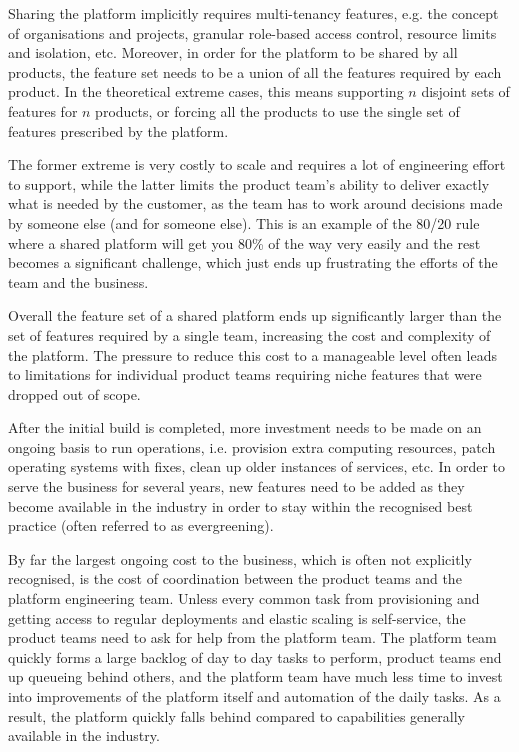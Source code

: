 \documentclass[reprint,amsmath,amssymb,aps]{revtex4-1}
\begin{document}
Sharing the platform implicitly requires multi-tenancy features, e.g. the concept of organisations and projects, granular role-based access control, resource limits and isolation, etc. Moreover, in order for the platform to be shared by all products, the feature set needs to be a union of all the features required by each product. In the theoretical extreme cases, this means supporting $n$ disjoint sets of features for $n$ products, or forcing all the products to use the single set of features prescribed by the platform.

The former extreme is very costly to scale and requires a lot of engineering effort to support, while the latter limits the product team’s ability to deliver exactly what is needed by the customer, as the team has to work around decisions made by someone else (and for someone else). This is an example of the 80/20 rule where a shared platform will get you 80\% of the way very easily and the rest becomes a significant challenge, which just ends up frustrating the efforts of the team and the business.

Overall the feature set of a shared platform ends up significantly larger than the set of features required by a single team, increasing the cost and complexity of the platform. The pressure to reduce this cost to a manageable level often leads to limitations for individual product teams requiring niche features that were dropped out of scope.

After the initial build is completed, more investment needs to be made on an ongoing basis to run operations, i.e. provision extra computing resources, patch operating systems with fixes, clean up older instances of services, etc. In order to serve the business for several years, new features need to be added as they become available in the industry in order to stay within the recognised best practice (often referred to as evergreening).

By far the largest ongoing cost to the business, which is often not explicitly recognised, is the cost of coordination between the product teams and the platform engineering team. Unless every common task from provisioning and getting access to regular deployments and elastic scaling is self-service, the product teams need to ask for help from the platform team. The platform team quickly forms a large backlog of day to day tasks to perform, product teams end up queueing behind others, and the platform team have much less time to invest into improvements of the platform itself and automation of the daily tasks. As a result, the platform quickly falls behind compared to capabilities generally available in the industry.
\end{document}
